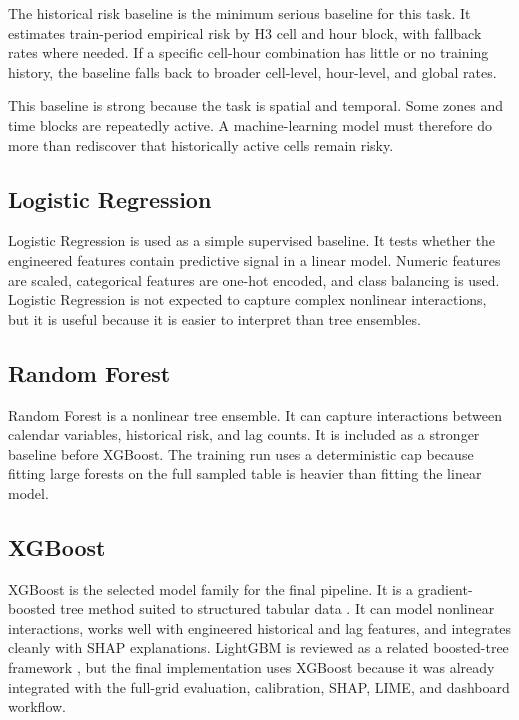 The historical risk baseline is the minimum serious baseline for this task. It estimates train-period empirical risk by H3 cell and hour block, with fallback rates where needed. If a specific cell-hour combination has little or no training history, the baseline falls back to broader cell-level, hour-level, and global rates.

This baseline is strong because the task is spatial and temporal. Some zones and time blocks are repeatedly active. A machine-learning model must therefore do more than rediscover that historically active cells remain risky.

\subsection{Logistic Regression}

Logistic Regression is used as a simple supervised baseline. It tests whether the engineered features contain predictive signal in a linear model. Numeric features are scaled, categorical features are one-hot encoded, and class balancing is used. Logistic Regression is not expected to capture complex nonlinear interactions, but it is useful because it is easier to interpret than tree ensembles.

\subsection{Random Forest}

Random Forest is a nonlinear tree ensemble. It can capture interactions between calendar variables, historical risk, and lag counts. It is included as a stronger baseline before XGBoost. The training run uses a deterministic cap because fitting large forests on the full sampled table is heavier than fitting the linear model.

\subsection{XGBoost}

XGBoost is the selected model family for the final pipeline. It is a gradient-boosted tree method suited to structured tabular data \cite{chen2016xgboost}. It can model nonlinear interactions, works well with engineered historical and lag features, and integrates cleanly with SHAP explanations. LightGBM is reviewed as a related boosted-tree framework \cite{ke2017lightgbm}, but the final implementation uses XGBoost because it was already integrated with the full-grid evaluation, calibration, SHAP, LIME, and dashboard workflow.

